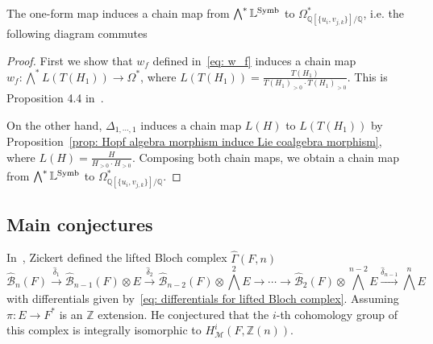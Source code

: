 \begin{theorem}\cite{ZDHZ_HopfAlgebrasOfMultiplePolylogarithmsAndHolomorphicOneForms}\label{thm: LSymb to de Rham}
The one-form map induces a chain map from $\bigwedge^*\mathbb L^{\operatorname{Symb}}$ to $\Omega^*_{\mathbb Q[\{u_i,v_{j,k}\}]/\mathbb Q}$, i.e. the following diagram commutes
\begin{center}
\end{center}
\end{theorem}

\begin{proof}
First we show that $w_f$ defined in~\eqref{eq: w_f} induces a chain map $w_f:\bigwedge^*L(T(H_1))\to\Omega^*$, where $L(T(H_1))=\frac{T(H_1)}{T(H_1)_{>0}\cdot T(H_1)_{>0}}$. This is Proposition 4.4 in~\cite{ZDHZ_HopfAlgebrasOfMultiplePolylogarithmsAndHolomorphicOneForms}.

On the other hand, $\Delta_{1,\cdots,1}$ induces a chain map $L(H)$ to $L(T(H_1))$ by Proposition~\ref{prop: Hopf algebra morphism induce Lie coalgebra morphism}, where $L(H)=\frac{H}{H_{>0}\cdot H_{>0}}$. Composing both chain maps, we obtain a chain map from $\bigwedge^*\mathbb L^{\operatorname{Symb}}$ to $\Omega^*_{\mathbb Q[\{u_i,v_{j,k}\}]/\mathbb Q}$.
\end{proof}

\subsection{Main conjectures}

In~\cite{Zickert_HolomorphicPolylogarithmsAndBlochComplexes}, Zickert defined the lifted Bloch complex $\widehat\Gamma(F,n)$
\begin{equation}\label{eq: lifted Bloch complex}
\widehat{\mathcal B}_n(F)\xrightarrow{\widehat\delta_1}\widehat{\mathcal B}_{n-1}(F)\otimes E\xrightarrow{\widehat\delta_2}\widehat{\mathcal B}_{n-2}(F)\otimes\textstyle\bigwedge^2 E\to\cdots\to\widehat{\mathcal B}_{2}(F)\otimes\textstyle\bigwedge^{n-2} E\xrightarrow{\widehat\delta_{n-1}}\textstyle\bigwedge^n E
\end{equation}
with differentials given by~\ref{eq: differentials for lifted Bloch complex}. Assuming $\pi:E\to F^*$ is an $\mathbb Z$ extension. He conjectured that the $i$-th cohomology group of this complex is integrally isomorphic to $H^i_{\mathcal M}(F,\mathbb Z(n))$.

